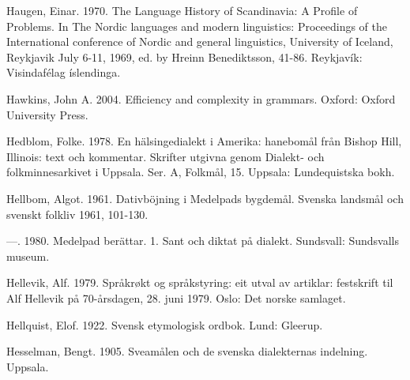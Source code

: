 \begin{styleBodytextC}
Haugen, Einar. 1970. The Language History of Scandinavia: A Profile of Problems. In The Nordic languages and modern linguistics: Proceedings of the International conference of Nordic and general linguistics, University of Iceland, Reykjavik July 6-11, 1969, ed. by Hreinn Benediktsson, 41-86. Reykjavík: Visindafélag íslendinga. 

\end{styleBodytextC}

\begin{styleBodytextC}
Hawkins, John A. 2004. Efficiency and complexity in grammars. Oxford: Oxford University Press.

\end{styleBodytextC}

\begin{styleBodytextC}
Hedblom, Folke. 1978. En hälsingedialekt i Amerika: hanebomål från Bishop Hill, Illinois: text och kommentar. Skrifter utgivna genom Dialekt- och folkminnesarkivet i Uppsala. Ser. A, Folkmål, 15. Uppsala: Lundequistska bokh.

\end{styleBodytextC}

\begin{styleBodytextC}
Hellbom, Algot. 1961. Dativböjning i Medelpads bygdemål. Svenska landsmål och svenskt folkliv 1961, 101-130.

\end{styleBodytextC}

\begin{styleBodytextC}
—. 1980. Medelpad berättar. 1. Sant och diktat på dialekt. Sundsvall: Sundsvalls museum.

\end{styleBodytextC}

\begin{styleBodytextC}
Hellevik, Alf. 1979. Språkrøkt og språkstyring: eit utval av artiklar: festskrift til Alf Hellevik på 70-årsdagen, 28. juni 1979. Oslo: Det norske samlaget.

\end{styleBodytextC}

\begin{styleBodytextC}
Hellquist, Elof. 1922. Svensk etymologisk ordbok. Lund: Gleerup.

\end{styleBodytextC}

\begin{styleBodytextC}
Hesselman, Bengt. 1905. Sveamålen och de svenska dialekternas indelning. Uppsala.

\end{styleBodytextC}

